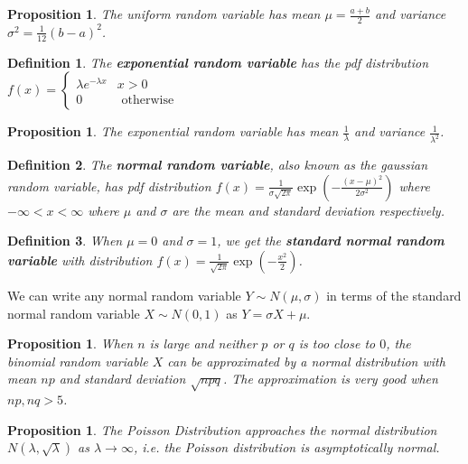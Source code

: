 \documentclass[12pt,twoside]{report}
\theoremstyle{thmstyle}
\newtheorem{defn}{Definition}
\newtheorem{prop}[subsection]{Proposition}
\begin{document}
\begin{prop}
The uniform random variable has mean $\mu = \frac{a + b}{2}$ and variance $\sigma^2 = \frac{1}{12} (b-a)^2$.
\end{prop}

\begin{defn}
    The \textbf{exponential random variable} has the pdf distribution $f(x) = \begin{cases} \lambda e^{-\lambda x} & x > 0 \\ 0 & \text{ otherwise } \end{cases}$
\end{defn}

\begin{prop}
The exponential random variable has mean $\frac{1}{\lambda}$ and variance $\frac{1}{\lambda^2}$.
\end{prop}

\begin{defn}
    The \textbf{normal random variable}, also known as the gaussian random variable, has pdf distribution $f(x) = \displaystyle \frac{1}{\sigma \sqrt{2 \pi}}  \exp\left(\displaystyle - \frac{(x-\mu)^2}{2 \sigma^2}\right)$ where $-\infty < x < \infty$ where $\mu$ and $\sigma$ are the mean and standard deviation respectively.
\end{defn}

\begin{defn}
When $\mu = 0$ and $\sigma = 1$, we get the \textbf{standard normal random variable} with distribution $f(x) = \displaystyle\frac{1}{\sqrt{2\pi}} \exp(-\frac{x^2}{2})$.
\end{defn}

We can write any normal random variable $Y \sim N(\mu, \sigma)$ in terms of the standard normal random variable $X \sim N(0,1)$ as $Y = \sigma X + \mu$.

\begin{prop}
    When $n$ is large and neither $p$ or $q$ is too close to $0$, the binomial random variable $X$ can be approximated by a normal distribution with mean $np$ and standard deviation $\sqrt{npq}$. The approximation is very good when $np, nq > 5$.
\end{prop}

\begin{prop}
    The Poisson Distribution approaches the normal distribution $N(\lambda, \sqrt{\lambda})$ as $\lambda \to \infty$, i.e. the Poisson distribution is asymptotically normal.
\end{prop}
\end{document}
